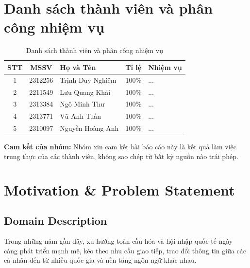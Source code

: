 \documentclass[a4paper, 12pt]{article}
\begin{document}
	\newpage
	\setcounter{page}{1}
	
	\section*{Danh sách thành viên và phân công nhiệm vụ}
	\vspace{0.5cm}
	\begin{center}
		\renewcommand{\arraystretch}{1.3}
		\setlength{\tabcolsep}{5pt}
		\begin{table}[h!]
			\centering
			\begin{tabular}{|c|c|p{4.5cm}|c|p{4cm}|}
				\hline
				\textbf{STT} & \textbf{MSSV} & \textbf{Họ và Tên} & \textbf{Tỉ lệ} & \textbf{Nhiệm vụ} \\ 
				\hline
				1 & 2312256 & Trịnh Duy Nghiêm & 100\% & ... \\ 
				\hline
				2 & 2211549 & Lưu Quang Khải & 100\% & ... \\ 
				\hline
				3 & 2313384 & Ngô Minh Thư & 100\% & ... \\ 
				\hline
				4 & 2313771 & Vũ Anh Tuấn & 100\% & ... \\ 
				\hline
				5 & 2310097 & Nguyễn Hoàng Anh & 100\% & ... \\ 
				\hline
			\end{tabular}
			\caption{Danh sách thành viên và phân công nhiệm vụ}
		\end{table}
	\end{center}
	
	\vspace{1cm}
	\noindent \textbf{Cam kết của nhóm:} Nhóm xin cam kết bài báo cáo này là kết quả làm việc trung thực của các thành viên, không sao chép từ bất kỳ nguồn nào trái phép.
	
	\newpage
	\tableofcontents
	\newpage
	

	\section{Motivation \& Problem Statement}
	\subsection{Domain Description}
	Trong những năm gần đây, xu hướng toàn cầu hóa và hội nhập quốc tế ngày càng phát triển mạnh mẽ, kéo theo nhu cầu giao tiếp, trao đổi thông tin giữa các cá nhân đến từ nhiều quốc gia và nền tảng ngôn ngữ khác nhau.
	
\end{document}
